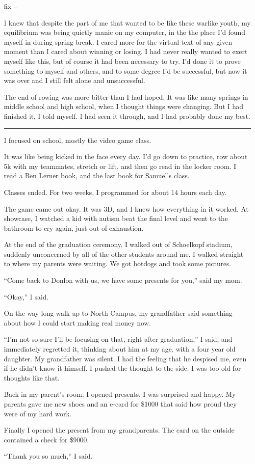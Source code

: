 fix --

I knew that despite the part of me that wanted to be like these warlike youth,
my equilibrium was being quietly manic on my computer, in the the place I'd
found myself in during spring break.  I cared more for the virtual text of any
given moment than I cared about winning or losing.  I had never really wanted to
exert myself like this, but of course it had been necessary to try.  I'd done it
to prove something to myself and others, and to some degree I'd be successful,
but now it was over and I still felt alone and unsuccessful.

The end of rowing was more bitter than I had hoped.  It was like many springs in
middle school and high school, when I thought things were changing.  But I had
finished it, I told myself.  I had seen it through, and I had probably done my
best.


\plainfancybreak{12pt}{2}{* * *}

I focused on school, mostly the video game class.

It was like being kicked in the face every day.  I'd go down to practice, row
about 5k with my teammates, stretch or lift, and then go read in the locker
room.  I read a Ben Lerner book, and the last book for Samuel's class.

Classes ended.  For two weeks, I programmed for about 14 hours each day.  

The game came out okay.  It was 3D, and I knew how everything in it worked.  At
showcase, I watched a kid with autism beat the final level and went to the
bathroom to cry again, just out of exhaustion.

At the end of the graduation ceremony, I walked out of Schoelkopf stadium,
suddenly unconcerned by all of the other students around me.  I walked straight
to where my parents were waiting.  We got hotdogs and took some pictures.  

``Come back to Donlon with us, we have some presents for you,'' said my mom. 

``Okay,'' I said.  

On the way long walk up to North Campus, my grandfather said something about how
I could start making real money now.

``I'm not so sure I'll be focusing on that, right after graduation,'' I said,
and immediately regretted it, thinking about him at my age, with a four year old
daughter.  My grandfather was silent.  I had the feeling that he despised me,
even if he didn't know it himself.  I pushed the thought to the side.  I was too
old for thoughts like that.

Back in my parent's room, I opened presents.  I was surprised and happy. My
parents gave me new shoes and an e-card for \$1000 that said how proud they were
of my hard work.  

Finally I opened the present from my grandparents.  The card on the outside
contained a check for \$9000.  

``Thank you so much,'' I said.
